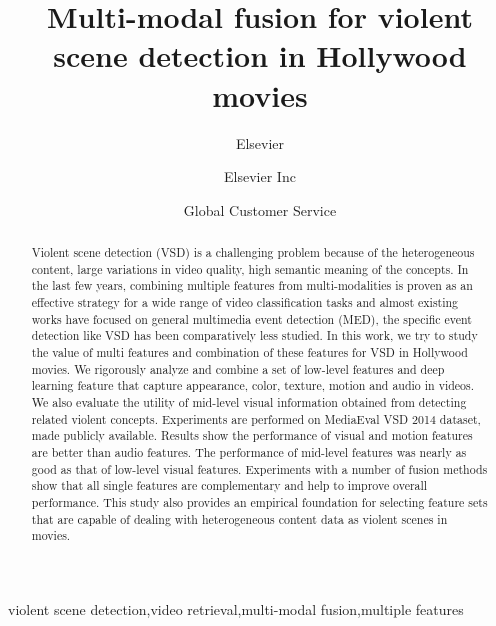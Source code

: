 \documentclass[review]{elsarticle}
\begin{document}
\begin{frontmatter}

\title{Multi-modal fusion for violent scene detection in Hollywood movies}

\author{Elsevier}
\address{Radarweg 29, Amsterdam}

\author[mymainaddress,mysecondaryaddress]{Elsevier Inc}

\author[mysecondaryaddress]{Global Customer Service}

\address[mymainaddress]{1600 John F Kennedy Boulevard, Philadelphia}
\address[mysecondaryaddress]{360 Park Avenue South, New York}

\begin{abstract}
Violent scene detection (VSD) is a challenging problem because of the heterogeneous content, large variations in video quality, high semantic meaning of the concepts. In the last few years, combining multiple features from multi-modalities is proven as an effective strategy for a wide range of video classification tasks and almost existing works have focused on general multimedia event detection (MED), the specific event detection like VSD has been comparatively less studied. In this work, we try to study the value of multi features and combination of these features for VSD in Hollywood movies. We rigorously analyze and combine a set of low-level features and deep learning feature that capture appearance, color, texture, motion and audio in videos. We also evaluate the utility of mid-level visual information obtained from detecting related violent concepts. Experiments are performed on MediaEval VSD 2014 dataset, made publicly available. Results show the performance of visual and motion features are better than audio features. The performance of mid-level features was nearly as good as that of low-level visual features. Experiments with a number of fusion methods show that all single features are complementary and help to improve overall performance. This study also provides an empirical foundation for selecting feature sets that are capable of dealing with heterogeneous content data as violent scenes in movies.
\end{abstract}

\begin{keyword}
violent scene detection,video retrieval,multi-modal fusion,multiple features
\end{keyword}

\end{frontmatter}
\end{document}
